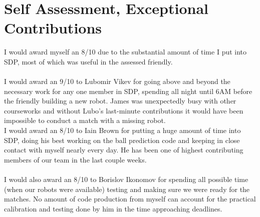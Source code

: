 \documentclass[a4paper,11pt]{article}
\begin{document}

\section{Self Assessment, Exceptional Contributions}

I would award myself an 8/10 due to the substantial amount of time I put into SDP, most of which was useful in the assessed friendly.\\
\\
I would award an 9/10 to Lubomir Vikev for going above and beyond the necessary work for any one member in SDP, spending all night until 6AM before the friendly building a new robot. James was unexpectedly busy with other courseworks and without Lubo's last-minute contributions it would have been impossible to conduct a match with a missing robot.
\\

I would award an 8/10 to Iain Brown for putting a huge amount of time into SDP, doing his best working on the ball prediction code and keeping in close contact with myself nearly every day. He has been one of highest contributing members of our team in the last couple weeks.\\
\\

I would also award an 8/10 to Borislov Ikonomov for spending all possible time (when our robots were available) testing and making sure we were ready for the matches. No amount of code production from myself can account for the practical calibration and testing done by him in the time approaching deadlines.


\end{document}
